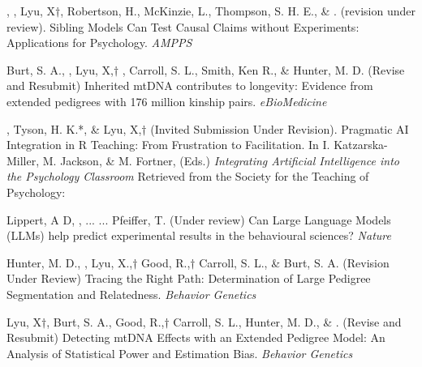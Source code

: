 
\item \meb, \jt, Lyu, X$\dagger$, Robertson, H.\noteA, McKinzie, L.\noteA, Thompson, S. H. E.\noteA, \& \joe. (revision under review). Sibling Models Can Test Causal Claims without Experiments: Applications for Psychology. \href{https://osf.io/zpdwt/}{\small\color{blue}{osf.io/zpdwt/}} \textit{AMPPS} %

\item Burt, S. A., \meb, Lyu, X,$\dagger$ \joe, Carroll, S. L., Smith, Ken R., \& Hunter, M. D. (Revise and Resubmit) Inherited mtDNA contributes to longevity: Evidence from extended pedigrees with 176 million kinship pairs. \textit{eBioMedicine}%

\item \meb, Tyson, H. K.*, \& Lyu, X,$\dagger$ (Invited Submission Under Revision). Pragmatic AI Integration in R Teaching: From Frustration to Facilitation.  In I. Katzarska-Miller, M. Jackson, \& M. Fortner,  (Eds.) \textit{Integrating Artificial Intelligence into the Psychology Classroom} Retrieved from the Society for the Teaching of Psychology: \href{http://teachpsych.org/ebooks/}{\small\color{blue}{teachpsych.org/ebooks/}}

\item Lippert, A D, , ... \meb ... Pfeiffer, T. (Under review) Can Large Language Models (LLMs) help predict experimental results in the behavioural sciences? \textit{Nature}

\item Hunter, M. D., \meb, Lyu, X.,$\dagger$ Good, R.,$\dagger$ Carroll, S. L., \& Burt, S. A. (Revision Under Review) Tracing the Right Path: Determination of Large Pedigree Segmentation and Relatedness. \textit{Behavior Genetics}

\item Lyu, X$\dagger$, Burt, S. A., Good, R.,$\dagger$ Carroll, S. L.,  Hunter, M. D., \& \meb. (Revise and Resubmit) Detecting mtDNA Effects with an Extended Pedigree Model: An Analysis of Statistical Power and Estimation Bias. %
\textit{Behavior Genetics}

